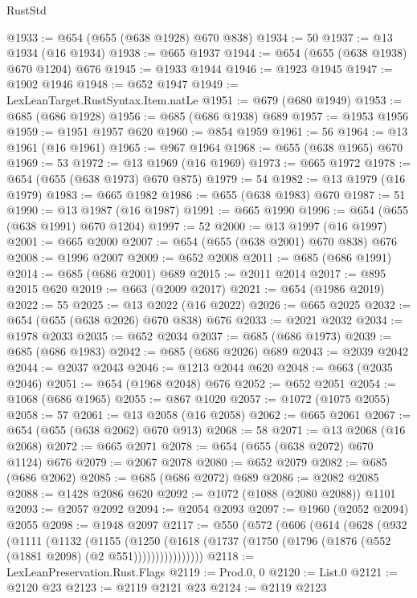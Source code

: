 \begin{lexlean}{RustStd}
\begin{coremodule}
{\begin{coremodule}
{{{{{{{{{{{{{{{@1933 := @654 (@655 (@638 @1928) @670 @838)
@1934 := 50
@1937 := @13 @1934 (@16 @1934)
@1938 := @665 @1937
@1944 := @654 (@655 (@638 @1938) @670 @1204) @676
@1945 := @1933 @1944
@1946 := @1923 @1945
@1947 := @1902 @1946
@1948 := @652 @1947
@1949 := LexLeanTarget.RustSyntax.Item.natLe
@1951 := @679 (@680 @1949)
@1953 := @685 (@686 @1928)
@1956 := @685 (@686 @1938) @689
@1957 := @1953 @1956
@1959 := @1951 @1957 @620
@1960 := @854 @1959
@1961 := 56
@1964 := @13 @1961 (@16 @1961)
@1965 := @967 @1964
@1968 := @655 (@638 @1965) @670
@1969 := 53
@1972 := @13 @1969 (@16 @1969)
@1973 := @665 @1972
@1978 := @654 (@655 (@638 @1973) @670 @875)
@1979 := 54
@1982 := @13 @1979 (@16 @1979)
@1983 := @665 @1982
@1986 := @655 (@638 @1983) @670
@1987 := 51
@1990 := @13 @1987 (@16 @1987)
@1991 := @665 @1990
@1996 := @654 (@655 (@638 @1991) @670 @1204)
@1997 := 52
@2000 := @13 @1997 (@16 @1997)
@2001 := @665 @2000
@2007 := @654 (@655 (@638 @2001) @670 @838) @676
@2008 := @1996 @2007
@2009 := @652 @2008
@2011 := @685 (@686 @1991)
@2014 := @685 (@686 @2001) @689
@2015 := @2011 @2014
@2017 := @895 @2015 @620
@2019 := @663 (@2009 @2017)
@2021 := @654 (@1986 @2019)
@2022 := 55
@2025 := @13 @2022 (@16 @2022)
@2026 := @665 @2025
@2032 := @654 (@655 (@638 @2026) @670 @838) @676
@2033 := @2021 @2032
@2034 := @1978 @2033
@2035 := @652 @2034
@2037 := @685 (@686 @1973)
@2039 := @685 (@686 @1983)
@2042 := @685 (@686 @2026) @689
@2043 := @2039 @2042
@2044 := @2037 @2043
@2046 := @1213 @2044 @620
@2048 := @663 (@2035 @2046)
@2051 := @654 (@1968 @2048) @676
@2052 := @652 @2051
@2054 := @1068 (@686 @1965)
@2055 := @867 @1020
@2057 := @1072 (@1075 @2055)
@2058 := 57
@2061 := @13 @2058 (@16 @2058)
@2062 := @665 @2061
@2067 := @654 (@655 (@638 @2062) @670 @913)
@2068 := 58
@2071 := @13 @2068 (@16 @2068)
@2072 := @665 @2071
@2078 := @654 (@655 (@638 @2072) @670 @1124) @676
@2079 := @2067 @2078
@2080 := @652 @2079
@2082 := @685 (@686 @2062)
@2085 := @685 (@686 @2072) @689
@2086 := @2082 @2085
@2088 := @1428 @2086 @620
@2092 := @1072 (@1088 (@2080 @2088)) @1101
@2093 := @2057 @2092
@2094 := @2054 @2093
@2097 := @1960 (@2052 @2094) @2055
@2098 := @1948 @2097
@2117 := @550
    (@572
      (@606
        (@614
          (@628
            (@932
              (@1111
                (@1132
                  (@1155
                    (@1250
                      (@1618
                        (@1737 (@1750 (@1796 (@1876 (@552 (@1881 @2098) (@2 @551))))))))))))))))
@2118 := LexLeanPreservation.Rust.Flags
@2119 := Prod.{0, 0}
@2120 := List.{0}
@2121 := @2120 @23
@2123 := @2119 @2121 @23
@2124 := @2119 @2123
}}}}}}}}}}}}}}}
\end{coremodule}}
\end{coremodule}
\end{lexlean}

